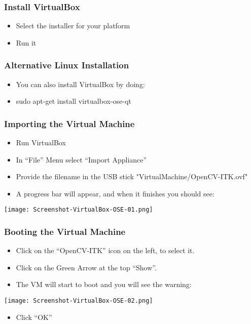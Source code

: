 \begin{frame}
\frametitle{Install VirtualBox}
\begin{itemize}
\item Select the installer for your platform
\item Run it
\end{itemize}
\end{frame}

\begin{frame}
\frametitle{Alternative Linux Installation}
\begin{itemize}
\item  You can also install VirtualBox by doing:
\item  sudo apt-get install virtualbox-ose-qt
\end{itemize}
\end{frame}

\begin{frame}
\frametitle{Importing the Virtual Machine}
\begin{itemize}
\item Run VirtualBox
\item In ``File'' Menu select ``Import Appliance''
\item Provide the filename in the USB stick "VirtualMachine/OpenCV-ITK.ovf"
\item A progress bar will appear, and when it finishes you should see:
\end{itemize}
\begin{center}
  \texttt{[image: Screenshot-VirtualBox-OSE-01.png]}
\end{center}
\end{frame}

\begin{frame}
\frametitle{Booting the Virtual Machine}
\begin{itemize}
\item Click on the ``OpenCV-ITK'' icon on the left, to select it.
\item Click on the Green Arrow at the top ``Show''.
\item The VM will start to boot and you will see the warning:
\end{itemize}
\begin{center}
  \texttt{[image: Screenshot-VirtualBox-OSE-02.png]}
\end{center}
\begin{itemize}
\item Click ``OK''
\end{itemize}
\end{frame}

